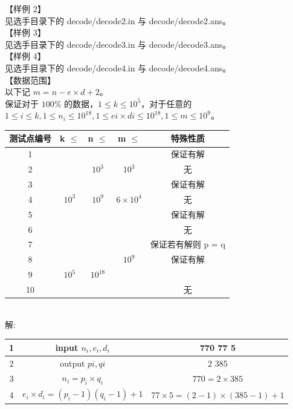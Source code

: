 \documentclass[12pt,twiside,a4paper]{ctexbook}
\numberwithin{chapter}{part}
\begin{document}
【样例 2】\\
见选手目录下的 decode/decode2.in 与 decode/decode2.ans。\\
【样例 3】\\
见选手目录下的 decode/decode3.in 与 decode/decode3.ans。\\
【样例 4】\\
见选手目录下的 decode/decode4.in 与 decode/decode4.ans。\\
【数据范围】\\
以下记 $m = n − e \times d + 2$。\\
保证对于 $100\%$ 的数据，$1 \leq k \leq 10^5$，对于任意的 $1 \leq i \leq k,1 \leq n_i \leq 10^{18}
, 1 \leq ei \times di \leq 10^{18}, 1 \leq m \leq 10^9$。\\
\begin{tabular}{|c|c|c|c|c|}
  \hline
  测试点编号 & k $\leq$ & n $\leq$ & m $\leq$ & 特殊性质 \\
  \hline
  1 & & & & 保证有解\\
  \cline{1-1}
  \cline{5-1}
  2 & & $10^3$ & $10^3$ & 无\\
  \cline{1-1}
  \cline{3-1}
  \cline{4-1}
  \cline{5-1}
  3 & & & & 保证有解\\
  \cline{1-1}
  \cline{5-1}
  4 &  $10^3$ & $10^9$ & $6\times 10^4$ & 无\\
  \cline{1-1}
  \cline{4-1}
  \cline{5-1}
  5 & & & & 保证有解\\
  \cline{1-1}
  \cline{5-1}
  6 & & & & 无\\
  \cline{1-1}
  \cline{2-1}
  \cline{3-1}
  \cline{5-1}
  7 & & & & 保证若有解则 p = q\\
  \cline{1-1}
  \cline{5-1}
  8 & & & $10^{9}$ & 保证有解\\
  \cline{1-1}
   \cline{5-1}
  9 & $10^5$ & $10^{18}$ &  & \\
  \cline{1-1}
  10 & & & & 无\\
  \hline
\end{tabular}\\
解:\\
\begin{tabular}{|c|c|c|}
\hline
1 & input $n_i, e_i, d_i$ & 770 77 5\\
\hline
2 & output $pi,qi$ & 2 385\\
\hline
3 & $n_i = p_i \times q_i$ & $770 = 2\times 385$\\
\hline
4 & $e_i \times d_i = (p_i − 1)(q_i − 1) + 1$ & $77\times 5 = (2-1)\times(385 - 1) +1$\\
\hline
\end{tabular}\\
\end{document}
